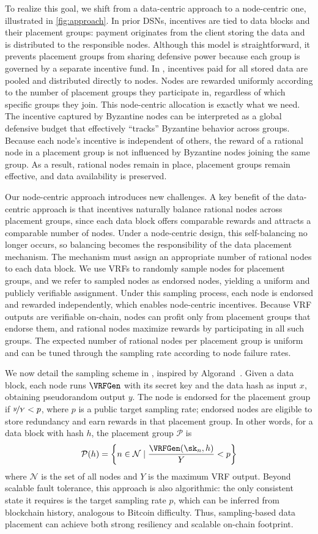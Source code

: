 To realize this goal, we shift from a data-centric approach to a node-centric one, illustrated in \cref{fig:approach}.
In prior DSNs, incentives are tied to data blocks and their placement groups: payment originates from the client storing the data and is distributed to the responsible nodes.
Although this model is straightforward, it prevents placement groups from sharing defensive power because each group is governed by a separate incentive fund.
In \sys, incentives paid for all stored data are pooled and distributed directly to nodes.
Nodes are rewarded uniformly according to the number of placement groups they participate in, regardless of which specific groups they join.
This node-centric allocation is exactly what we need.
The incentive captured by Byzantine nodes can be interpreted as a global defensive budget that effectively ``tracks'' Byzantine behavior across groups.
Because each node's incentive is independent of others, the reward of a rational node in a placement group is not influenced by Byzantine nodes joining the same group.
As a result, rational nodes remain in place, placement groups remain effective, and data availability is preserved.

Our node-centric approach introduces new challenges.
A key benefit of the data-centric approach is that incentives naturally balance rational nodes across placement groups, since each data block offers comparable rewards and attracts a comparable number of nodes.
Under a node-centric design, this self-balancing no longer occurs, so balancing becomes the responsibility of the data placement mechanism.
The mechanism must assign an appropriate number of rational nodes to each data block.
We use VRFs to randomly sample nodes for placement groups, and we refer to sampled nodes as endorsed nodes, yielding a uniform and publicly verifiable assignment.
Under this sampling process, each node is endorsed and rewarded independently, which enables node-centric incentives.
Because VRF outputs are verifiable on-chain, nodes can profit only from placement groups that endorse them, and rational nodes maximize rewards by participating in all such groups.
The expected number of rational nodes per placement group is uniform and can be tuned through the sampling rate according to node failure rates.

We now detail the sampling scheme in \sys, inspired by Algorand~\cite{algorand}.
Given a data block, each node runs $\VRFGen$ with its secret key and the data hash as input $x$, obtaining pseudorandom output $y$.
The node is endorsed for the placement group if $\nicefrac{y}{Y}<p$, where $p$ is a public target sampling rate; endorsed nodes are eligible to store redundancy and earn rewards in that placement group.
In other words, for a data block with hash $h$, the placement group $\mathcal{P}$ is
$$\mathcal{P}(h)=\left\{n\in\mathcal{N}\mid\frac{\VRFGen(\sk_n,h)}{Y}<p\right\}$$
where $\mathcal{N}$ is the set of all nodes and $Y$ is the maximum VRF output.
Beyond scalable fault tolerance, this approach is also algorithmic: the only consistent state it requires is the target sampling rate $p$, which can be inferred from blockchain history, analogous to Bitcoin difficulty.
Thus, sampling-based data placement can achieve both strong resiliency and scalable on-chain footprint.

